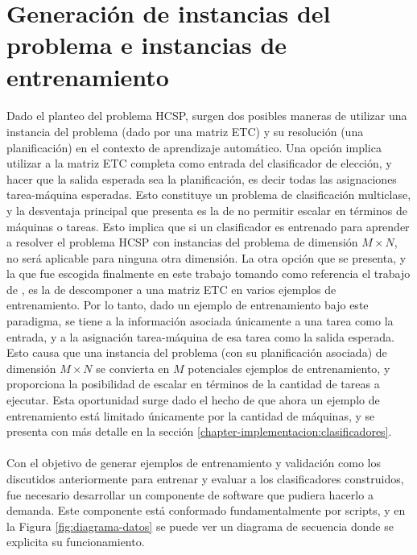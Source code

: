 \section{Generación de instancias del problema e instancias de entrenamiento} \label{chapter-implementacion:data}

\paragraph{} Dado el planteo del problema HCSP, surgen dos posibles maneras de utilizar una instancia del problema (dado por una matriz ETC) y su resolución (una planificación) en el contexto de aprendizaje automático. Una opción implica utilizar a la matriz ETC completa como entrada del clasificador de elección, y hacer que la salida esperada sea la planificación, es decir todas las asignaciones tarea-máquina esperadas. Esto constituye un problema de clasificación multiclase, y la desventaja principal que presenta es la de no permitir escalar en términos de máquinas o tareas. Esto implica que si un clasificador es entrenado para aprender a resolver el problema HCSP con instancias del problema de dimensión $M \times N$, no será aplicable para ninguna otra dimensión. La otra opción que se presenta, y la que fue escogida finalmente en este trabajo tomando como referencia el trabajo de \citet{savant-original}, es la de descomponer a una matriz ETC en varios ejemplos de entrenamiento. Por lo tanto, dado un ejemplo de entrenamiento bajo este paradigma, se tiene a la información asociada únicamente a una tarea como la entrada, y a la asignación tarea-máquina de esa tarea como la salida esperada. Esto causa que una instancia del problema (con su planificación asociada) de dimensión $M \times N$ se convierta en $M$ potenciales ejemplos de entrenamiento, y proporciona la posibilidad de escalar en términos de la cantidad de tareas a ejecutar. Esta oportunidad surge dado el hecho de que ahora un ejemplo de entrenamiento está limitado únicamente por la cantidad de máquinas, y se presenta con más detalle en la sección \ref{chapter-implementacion:clasificadores}.


\paragraph{} Con el objetivo de generar ejemplos de entrenamiento y validación como los discutidos anteriormente para entrenar y evaluar a los clasificadores construidos, fue necesario desarrollar un componente de software que pudiera hacerlo a demanda. Este componente está conformado fundamentalmente por scripts, y en la Figura \ref{fig:diagrama-datos} se puede ver un diagrama de secuencia donde se explicita su funcionamiento. 

